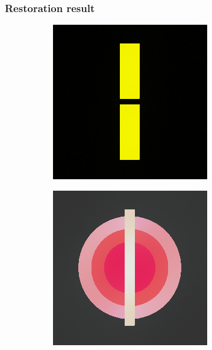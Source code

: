 \documentclass[xcolor=dvipsnames, xetex,serif]{beamer}
\begin{document}
    \begin{frame}
        \frametitle{Restoration result}
        \begin{figure}[H]
            \centering
            \begin{subfigure}{0.15\linewidth}
                \centering
                \includegraphics[width=0.9\linewidth]{images/result_ex1/timemarch01.png}
            \end{subfigure}
            \begin{subfigure}{0.15\linewidth}
                \centering
                \includegraphics[width=0.9\linewidth]{images/result_ex1/timemarch02.png}

\end{subfigure}
\end{figure}
\end{frame}
\end{document}
